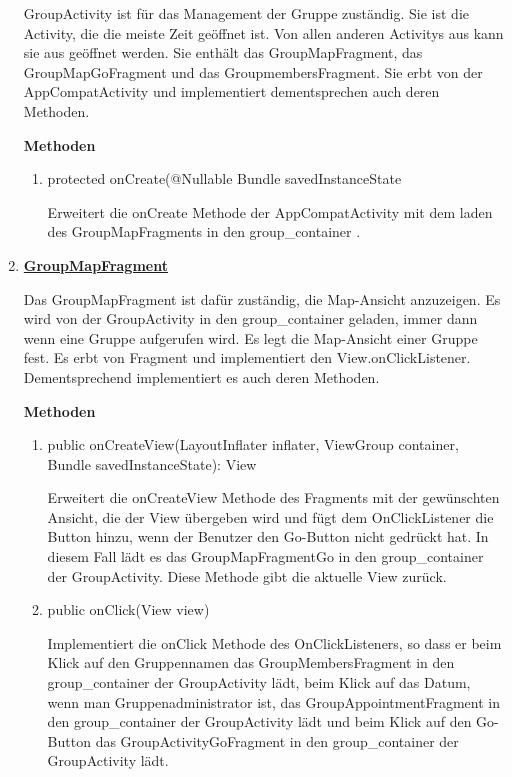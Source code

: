 \begin{enumerate}
	GroupActivity ist für das Management der Gruppe zuständig. Sie ist die Activity, die die meiste Zeit geöffnet ist. Von allen anderen Activitys aus kann sie aus geöffnet werden. Sie enthält das GroupMapFragment, das GroupMapGoFragment und das GroupmembersFragment. Sie erbt von der AppCompatActivity und implementiert dementsprechen auch deren Methoden.
	
	\textbf{Methoden}
	
	\begin{enumerate}
		\item protected onCreate(@Nullable Bundle savedInstanceState

		Erweitert die onCreate Methode der AppCompatActivity mit dem laden des GroupMapFragments in den group\_container .
	\end{enumerate}
	
	\item \textbf{\underline{GroupMapFragment}}
	
	Das GroupMapFragment ist dafür zuständig, die Map-Ansicht anzuzeigen. Es wird von der GroupActivity in den group\_container geladen, immer dann wenn eine Gruppe aufgerufen wird. Es legt die Map-Ansicht einer Gruppe fest. Es erbt von Fragment und implementiert den View.onClickListener. Dementsprechend implementiert es auch deren Methoden.
	
	\textbf{Methoden}	
	\begin{enumerate}
		\item public onCreateView(LayoutInflater inflater, ViewGroup container, Bundle savedInstanceState): View
		
		Erweitert die onCreateView Methode des Fragments mit der gewünschten Ansicht, die der View übergeben wird und fügt dem OnClickListener die Button hinzu, wenn der Benutzer den Go-Button nicht gedrückt hat. In diesem Fall lädt es das GroupMapFragmentGo in den group\_container der GroupActivity. Diese Methode gibt die aktuelle View zurück.
		
		\item public onClick(View view)
		
		Implementiert die onClick Methode des OnClickListeners, so dass er beim Klick auf den Gruppennamen das GroupMembersFragment in den group\_container der GroupActivity lädt, beim Klick auf das Datum, wenn man Gruppenadministrator ist, das GroupAppointmentFragment in den group\_container der GroupActivity lädt und beim Klick auf den Go-Button das GroupActivityGoFragment in den group\_container der GroupActivity lädt.	
	\end{enumerate}
	

\end{enumerate}
